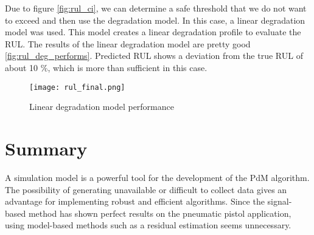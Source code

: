 Due to figure \ref{fig:rul_ci}, we can determine a safe threshold that we do not want
to exceed and then use the degradation model. In this case, a linear
degradation model was used. This model creates a linear degradation profile
to evaluate the RUL. The results of the linear degradation model are pretty
good \ref{fig:rul_deg_performs}. Predicted RUL shows a deviation from the true RUL of about 10 \%, which
is more than sufficient in this case.

\begin{figure}[h!]
    \centering
    \texttt{[image: rul\_final.png]}
    \caption{Linear degradation model performance}
    \label{fig:rul_deg_preforms}
\end{figure}


\section{Summary}
A simulation model is a powerful tool for the development of the PdM
algorithm. The possibility of generating unavailable or difficult to
collect data gives an advantage for implementing robust and efficient
algorithms. Since the signal-based method has shown perfect results on the
pneumatic pistol application, using model-based methods such as a residual
estimation seems unnecessary.

